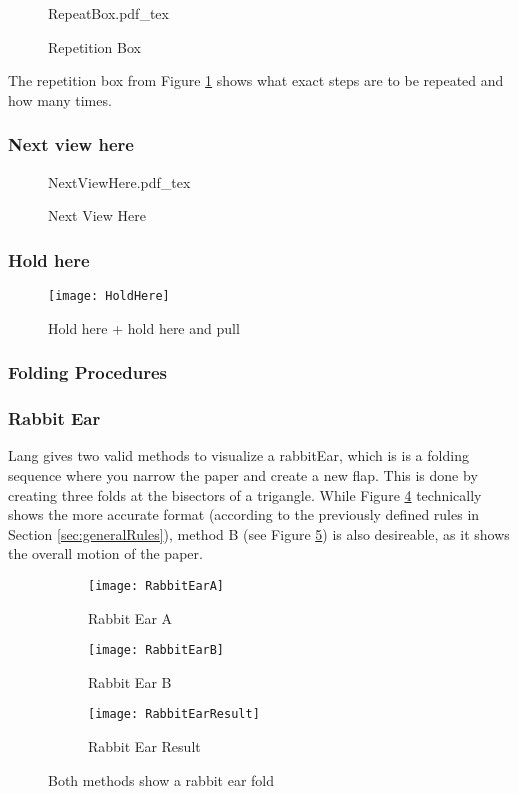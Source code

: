 \begin{figure}[htbp]
	\centering
	\def\svgwidth{0.3\textwidth}
	{RepeatBox.pdf_tex}
	\caption{Repetition Box}
	\label{fig:repeatBox}
\end{figure}
\noindent The repetition box from Figure \ref{fig:repeatBox} shows what exact steps are to be repeated and how many times.

\subsubsection*{Next view here}
\begin{figure}[htbp]
	\centering
	\def\svgwidth{0.6\textwidth}
	{NextViewHere.pdf_tex}
	\caption{Next View Here}
	\label{fig:nextViewHere}
\end{figure}

\subsubsection*{Hold here}
\begin{figure}[htbp]
	\centering
	\texttt{[image: HoldHere]}
	\caption{Hold here + hold here and pull}
	\label{fig:holdHere}
\end{figure}

\newpage
\subsubsection{Folding Procedures}
\subsubsection*{Rabbit Ear}
Lang gives two valid methods to visualize a \gls{rabbitEar}, which is is a folding sequence where you narrow the paper
and create a new flap. This is done by creating three folds at the bisectors of a trigangle. While Figure \ref{fig:rabbitEarA} technically shows the more accurate format (according to the previously defined rules in Section \ref{sec:generalRules}), method B (see Figure \ref{fig:rabbitEarB}) is also desireable, as it shows the overall motion of the paper.
\begin{figure*}[htbp]
    \centering
    \begin{subfigure}{0.27\textwidth}
        \texttt{[image: RabbitEarA]}
        \caption{Rabbit Ear A}
        \label{fig:rabbitEarA}
    \end{subfigure}
    \begin{subfigure}{0.35\textwidth}
        \texttt{[image: RabbitEarB]}
        \caption{Rabbit Ear B}
        \label{fig:rabbitEarB}
    \end{subfigure}
    \begin{subfigure}{0.33\textwidth}
	\texttt{[image: RabbitEarResult]}
	\caption{Rabbit Ear Result}
	\label{fig:rabbitEarResult}
    \end{subfigure}
    \caption{Both methods show a rabbit ear fold}
    \label{fig:rabbitEarMethods}
\end{figure*}

